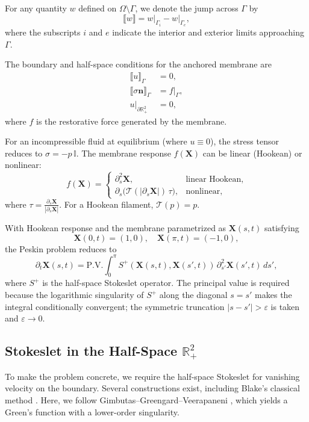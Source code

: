 \documentclass{amsart}
\newcommand{\mX}{\mathbf{X}}
\newcommand{\mn}{\mathbf{n}}
\newcommand{\jump}[1]{\llbracket{#1}\rrbracket}
\begin{document}
For any quantity $w$ defined on $\Omega \setminus \Gamma$, we denote the jump across $\Gamma$ by
\[
\jump{w} = \left. w \right|_{\Gamma_i} - \left. w \right|_{\Gamma_e},
\]
where the subscripts $i$ and $e$ indicate the interior and exterior limits approaching $\Gamma$.

The boundary and half-space conditions for the anchored membrane are
\begin{align*}
\jump{u}_{\Gamma} &= 0, \\
\jump{\sigma \mn}_{\Gamma} &= f|_{\Gamma}, \\
u|_{\partial \mathbb{R}_+^2} &= 0,
\end{align*}
where $f$ is the restorative force generated by the membrane.  

For an incompressible fluid at equilibrium (where $u \equiv 0$), the stress tensor reduces to $\sigma = -p \, \mathbb{I}$.  
The membrane response $f(\mX)$ can be linear (Hookean) or nonlinear:
\[
f(\mX) =
\begin{cases}
\partial_s^2 \mX, & \text{linear Hookean},\\[1mm]
\partial_s \big( \mathcal{T}(|\partial_s \mX|)\, \tau \big), & \text{nonlinear},
\end{cases}
\]
where $\tau = \frac{\partial_s \mX}{|\partial_s \mX|}$.  
For a Hookean filament, $\mathcal{T}(p) = p$.

With Hookean response and the membrane parametrized as $\mX(s,t)$ satisfying
\[
\mX(0,t) = (1,0), \quad \mX(\pi,t) = (-1,0),
\]
the Peskin problem reduces to
\[
\partial_t \mX(s,t) = \text{P.V.} \int_0^\pi S^+(\mX(s,t),\mX(s',t))\, \partial^2_{s'} \mX(s',t)\, ds',
\]
where $S^+$ is the half-space Stokeslet operator. The principal value is required because the logarithmic singularity of $S^+$ along the diagonal $s = s'$ makes the integral conditionally convergent; the symmetric truncation $|s - s'| > \varepsilon$ is taken and $\varepsilon \to 0$.

\subsection{Stokeslet in the Half-Space $\mathbb{R}_+^2$}

To make the problem concrete, we require the half-space Stokeslet for vanishing velocity on the boundary.  
Several constructions exist, including Blake's classical method \cite{blake1971note}.  
Here, we follow Gimbutas--Greengard--Veerapaneni \cite{gimbutas2015simple}, which yields a Green's function with a lower-order singularity.  
\end{document}
